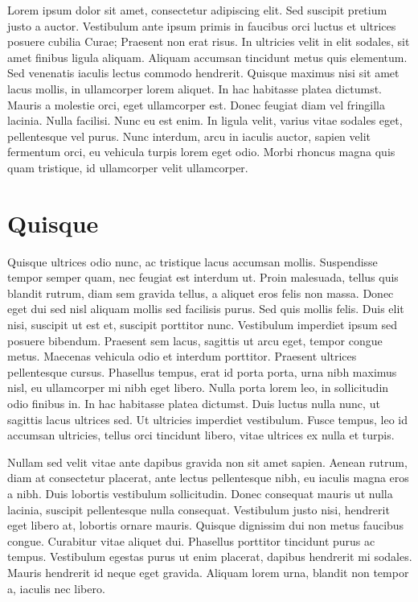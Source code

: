 

\setcounter{page}{1}

Lorem ipsum dolor sit amet, consectetur adipiscing elit. Sed suscipit pretium justo a auctor. Vestibulum ante ipsum primis in faucibus orci luctus et ultrices posuere cubilia Curae; Praesent non erat risus. In ultricies velit in elit sodales, sit amet finibus ligula aliquam. Aliquam accumsan tincidunt metus quis elementum. Sed venenatis iaculis lectus commodo hendrerit. Quisque maximus nisi sit amet lacus mollis, in ullamcorper lorem aliquet. In hac habitasse platea dictumst. Mauris a molestie orci, eget ullamcorper est. Donec feugiat diam vel fringilla lacinia. Nulla facilisi. Nunc eu est enim. In ligula velit, varius vitae sodales eget, pellentesque vel purus. Nunc interdum, arcu in iaculis auctor, sapien velit fermentum orci, eu vehicula turpis lorem eget odio. Morbi rhoncus magna quis quam tristique, id ullamcorper velit ullamcorper.

\section{Quisque}

Quisque ultrices odio nunc, ac tristique lacus accumsan mollis. Suspendisse tempor semper quam, nec feugiat est interdum ut. Proin malesuada, tellus quis blandit rutrum, diam sem gravida tellus, a aliquet eros felis non massa. Donec eget dui sed nisl aliquam mollis sed facilisis purus. Sed quis mollis felis. Duis elit nisi, suscipit ut est et, suscipit porttitor nunc. Vestibulum imperdiet ipsum sed posuere bibendum. Praesent sem lacus, sagittis ut arcu eget, tempor congue metus. Maecenas vehicula odio et interdum porttitor. Praesent ultrices pellentesque cursus. Phasellus tempus, erat id porta porta, urna nibh maximus nisl, eu ullamcorper mi nibh eget libero. Nulla porta lorem leo, in sollicitudin odio finibus in. In hac habitasse platea dictumst. Duis luctus nulla nunc, ut sagittis lacus ultrices sed. Ut ultricies imperdiet vestibulum. Fusce tempus, leo id accumsan ultricies, tellus orci tincidunt libero, vitae ultrices ex nulla et turpis.

Nullam sed velit vitae ante dapibus gravida non sit amet sapien. Aenean rutrum, diam at consectetur placerat, ante lectus pellentesque nibh, eu iaculis magna eros a nibh. Duis lobortis vestibulum sollicitudin. Donec consequat mauris ut nulla lacinia, suscipit pellentesque nulla consequat. Vestibulum justo nisi, hendrerit eget libero at, lobortis ornare mauris. Quisque dignissim dui non metus faucibus congue. Curabitur vitae aliquet dui. Phasellus porttitor tincidunt purus ac tempus. Vestibulum egestas purus ut enim placerat, dapibus hendrerit mi sodales. Mauris hendrerit id neque eget gravida. Aliquam lorem urna, blandit non tempor a, iaculis nec libero.

